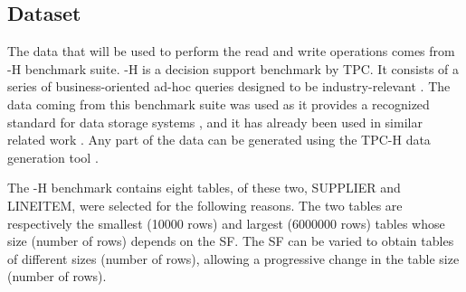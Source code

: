 \subsection{Dataset}
\label{subsec:dataset}

The data that will be used to perform the read and write operations comes from -H benchmark suite\cite{TPCHHomepage}. -H is a decision support benchmark by \gls{TPC}. It consists of a series of business-oriented ad-hoc queries designed to be industry-relevant \cite{transactionprocessingperformancecounciltpcTPCH_v301pdf1993}. The data coming from this benchmark suite was used as
it provides a recognized standard for data storage systems \cite{TPC_benchmarks_2000}, and it has already been used in similar related work \cite{raasveldtDuckDBEmbeddableAnalytical2019, behmPhotonFastQuery2022}. Any part of the data can be generated using the TPC-H data generation tool \cite{TPCCurrentSpecs}.

The -H benchmark contains eight tables, of these two, SUPPLIER and LINEITEM, were selected for the following reasons. The two tables are respectively the smallest (10000 rows) and largest (6000000 rows) tables whose size (number of rows) depends on the \gls{SF}. The \gls{SF} can be varied to obtain tables of different sizes (number of rows), allowing a progressive change in the table size (number of rows). 

